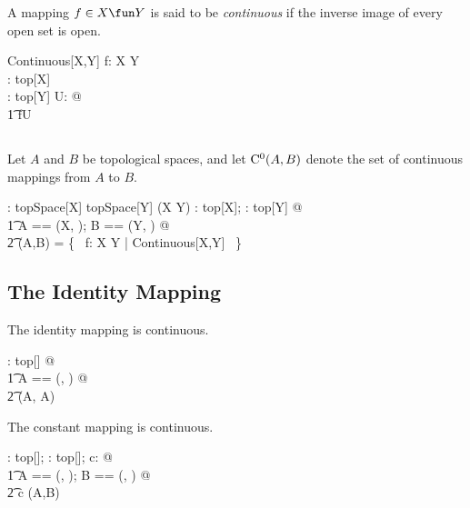 \documentclass[11pt, oneside]{article}
\begin{document}
A mapping $f \in X \fun Y$ is said to be {\it continuous} if the inverse image of every open set is open.

\begin{schema}{Continuous}[X,Y]
	f: X \fun Y \\
	\tau: top[X] \\
	\sigma: top[Y]
\where
	\forall U: \sigma @ \\
	\t1	f\inv\limg U \rimg \in \tau
\end{schema}

\subsection{}

Let $A$ and $B$ be topological spaces, and
let $\operatorname{C^0}(A,B)$ denote the set of continuous mappings from $A$ to $B$.

\begin{gendef}[X,Y]
	\CzeroTT: topSpace[X] \cross topSpace[Y] \fun \power (X \fun Y)
\where
	\forall \tau: top[X]; \sigma: top[Y] @ \\
	\t1	\LET A == (X, \tau); B == (Y, \sigma) @ \\
	\t2		\CzeroTT(A,B) = \{~ f: X \fun Y | Continuous[X,Y] ~\}
\end{gendef}

\subsection{The Identity Mapping}

\begin{remark}
The identity mapping is continuous.

\begin{zed}
	\forall \tau: top[\setX] @ \\
	\t1	\LET A == (\setX, \tau) @ \\
	\t2		\id \setX \in \CzeroTT(A, A)
\end{zed}

\end{remark}

\begin{remark}
The constant mapping is continuous.

\begin{zed}
	\forall \tau: top[\setX]; \sigma: top[\setY]; c: \setY @ \\
	\t1	\LET A == (\setX, \tau); B == (\setY, \sigma) @ \\
	\t2		\const[\setX,\setY] c \in \CzeroTT(A,B)
\end{zed}

\end{remark}
\end{document}
